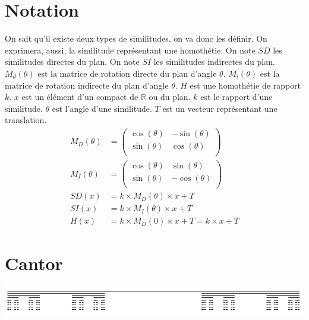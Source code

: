 \documentclass[a4paper, 12pt]{report}
\begin{document}
		\section{Notation}
			On sait qu'il existe deux types de similitudes, on va donc les définir. On exprimera, aussi, la similitude représentant une homothétie.
			\vspace{.3cm}
			On note $SD$ les similitudes directes du plan.\newline
			On note $SI$ les similitudes indirectes du plan.\newline
			$M_d(\theta)$ est la matrice de rotation directe du plan d'angle $\theta$.\newline
			$M_i(\theta)$ est la matrice de rotation indirecte du plan d'angle $\theta$.\newline
			$H$ est une homothétie de rapport $k$.
			$x$ est un élément d'un compact de $\mathds{R}$ ou du plan.\newline
			$k$ est le rapport d'une similitude.\newline
			$\theta$ est l'angle d'une similitude.\newline
			$T$ est un vecteur représentant une translation.\newline
			\begin{align*}
				M_D(\theta)&=\left(	\begin{array}{ccc}
								\cos(\theta) &  -\sin(\theta) \\
								\sin(\theta) &  \cos(\theta)  \\
									\end{array} \right)\\
				M_I(\theta)&=\left(	\begin{array}{ccc}
								\cos(\theta) &  \sin(\theta) \\
								\sin(\theta) &  -\cos(\theta)  \\
									\end{array} \right)\\
				SD(x)&=k\times M_D(\theta)\times x + T\\
				SI(x)&=k\times M_I(\theta)\times x + T\\
				H(x)&=k\times M_D(0)\times x +T=k\times x+T
			\end{align*}
			
\newpage
		\section{Cantor}
			\includegraphics[scale=0.8]{Images/cantor}
\end{document}
